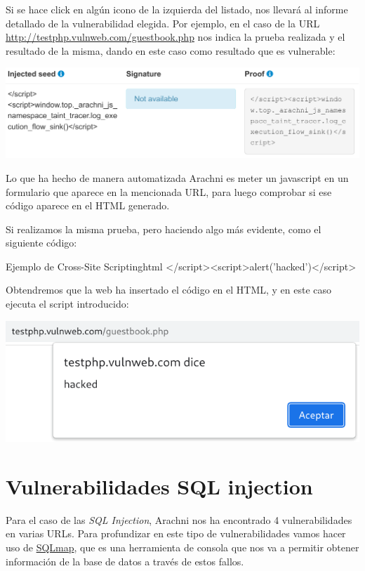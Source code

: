 \documentclass{\ClassPath/viu-tfm-template}
\begin{document}
Si se hace click en algún icono de la izquierda del listado, nos llevará al informe detallado de la vulnerabilidad elegida. Por ejemplo, en el caso de la URL \href{http://testphp.vulnweb.com/guestbook.php}{http://testphp.vulnweb.com/guestbook.php} nos indica la prueba realizada y el resultado de la misma, dando en este caso como resultado que es vulnerable:

\begin{center}
    \vspace{-10pt}
    \includegraphics[frame,width=0.9\linewidth]{img/informe_xss.png}
\end{center}

Lo que ha hecho de manera automatizada Arachni es meter un javascript en un formulario que aparece en la mencionada URL, para luego comprobar si ese código aparece en el HTML generado.

Si realizamos la misma prueba, pero haciendo algo más evidente, como el siguiente código:

\begin{mycode}{Ejemplo de Cross-Site Scripting}{html}{}
</script><script>alert('hacked')</script>
\end{mycode}

Obtendremos que la web ha insertado el código en el HTML, y en este caso ejecuta el script introducido:


\begin{center}
    \vspace{-10pt}
    \includegraphics[width=0.7\linewidth]{img/ejemplo_xss.png}
\end{center}
\vspace{-10pt}



\chapter{Vulnerabilidades SQL injection}
Para el caso de las \textit{SQL Injection}, Arachni nos ha encontrado 4 vulnerabilidades en varias URLs. Para profundizar en este tipo de vulnerabilidades vamos hacer uso de \href{https://sqlmap.org/}{SQLmap}, que es una herramienta de consola que nos va a permitir obtener información de la base de datos a través de estos fallos.
\end{document}
